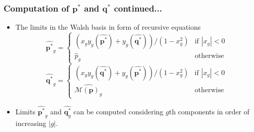 \documentclass[aspectratio=169]{beamer}
\begin{document}
  \begin{frame}
    \frametitle{Computation of $\bm{p}^\ast$ and ${\bm q}^\ast$ continued... }
    \begin{itemize}
    \item
    The limits in the Walsh basis in form of recursive equations 
    \[   
    \widehat{{\bm p}^{\ast}}_g  = \begin{cases}
	(x_g y_g(\widehat{{\bm p}^{\ast}}) + y_g(\widehat{{\bm q}^{\ast}}))/(1-x_g^2)  & \text{if $|x_g| < 0$}\\
	\widehat{p}_g  & \text{otherwise}
      \end{cases}
    \]
    \[
    \widehat{{\bm q}^{\ast}}_g  = \begin{cases}
	(x_g y_g(\widehat{{\bm q}^{\ast}}) + y_g(\widehat{{\bm p}^{\ast}}))/(1-x_g^2)  & \text{if $|x_g| < 0$}\\
	\widehat{\mathcal{M}({\bm p})_g}  & \text{otherwise}
      \end{cases}
    \]
    
    \item
    Limits $\widehat{{\bm p}^{\ast}}_g$ and $\widehat{{\bm q}^{\ast}_g}$ can be computed considering $g$th components in order of increasing $|g|$.


    
    \end{itemize}
  \end{frame}
  
\end{document}
